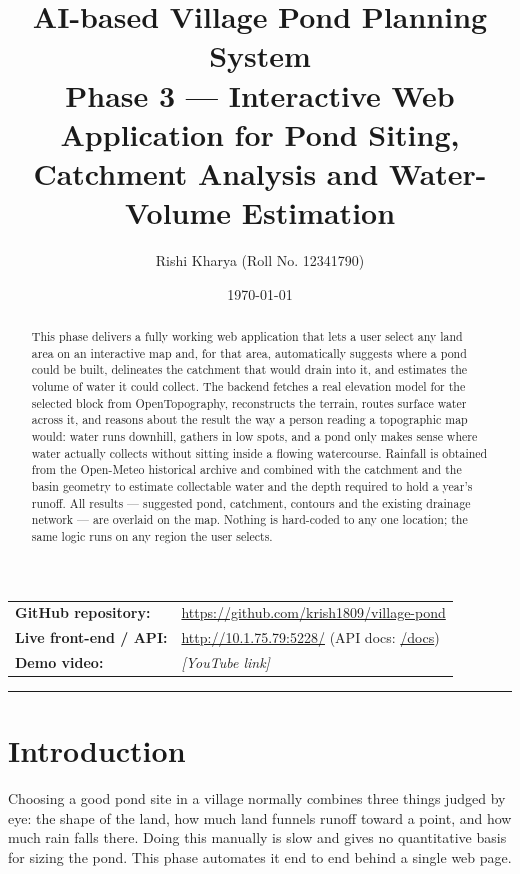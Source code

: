\documentclass[11pt]{article}
\title{\vspace{-1.5em}\textbf{AI-based Village Pond Planning System}\\[0.3em]
\large Phase 3 --- Interactive Web Application for Pond Siting,\\ Catchment Analysis and Water-Volume Estimation}
\author{Rishi Kharya (Roll No. 12341790)}
\date{\today}
\begin{document}
\maketitle
\vspace{-1.5em}

\begin{center}
\begin{tabular}{ll}
\textbf{GitHub repository:} & \url{https://github.com/krish1809/village-pond}\\
\textbf{Live front-end / API:} & \url{http://10.1.75.79:5228/} \quad(API docs: \href{http://10.1.75.79:5228/docs}{/docs})\\
\textbf{Demo video:} & \emph{[YouTube link]}\\
\end{tabular}
\end{center}

\hrule
\vspace{0.5em}

\begin{abstract}
\noindent
This phase delivers a fully working web application that lets a user select any land
area on an interactive map and, for that area, automatically suggests where a pond
could be built, delineates the catchment that would drain into it, and estimates the
volume of water it could collect. The backend fetches a real elevation model for the
selected block from OpenTopography, reconstructs the terrain, routes surface water
across it, and reasons about the result the way a person reading a topographic map
would: water runs downhill, gathers in low spots, and a pond only makes sense where
water actually collects without sitting inside a flowing watercourse. Rainfall is
obtained from the Open-Meteo historical archive and combined with the catchment and
the basin geometry to estimate collectable water and the depth required to hold a
year's runoff. All results --- suggested pond, catchment, contours and the existing
drainage network --- are overlaid on the map. Nothing is hard-coded to any one
location; the same logic runs on any region the user selects.
\end{abstract}

\section{Introduction}

Choosing a good pond site in a village normally combines three things judged by eye:
the shape of the land, how much land funnels runoff toward a point, and how much rain
falls there. Doing this manually is slow and gives no quantitative basis for sizing
the pond. This phase automates it end to end behind a single web page.
\end{document}
